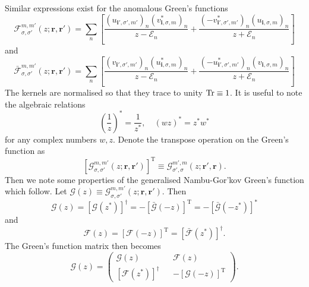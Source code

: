 Similar expressions exist for the anomalous Green's functions
\begin{equation}
\mathcal{F}_{\sigma,\sigma'}^{m,m'}\left(z;\mathbf{r},\mathbf{r}'\right)
=
\sum_n
\left[
\frac{
(u_{\mathbf{i}',\sigma',m'})_n
(v^*_{\mathbf{i},\sigma,m})_n
}{z-\mathcal{E}_n}
+
\frac{
(-v^*_{\mathbf{i}',\sigma',m'})_n
(u_{\mathbf{i},\sigma,m})_n
}{z+\mathcal{E}_n}
\right]
\end{equation}
and
\begin{equation}
\bar{\mathcal{F}}_{\sigma,\sigma'}^{m,m'}\left(z;\mathbf{r},\mathbf{r}'\right)
=
\sum_n
\left[
\frac{
(v_{\mathbf{i}',\sigma',m'})_n
(u^*_{\mathbf{i},\sigma,m})_n
}{z-\mathcal{E}_n}
+
\frac{
(-u^*_{\mathbf{i}',\sigma',m'})_n
(v_{\mathbf{i},\sigma,m})_n
}{z+\mathcal{E}_n}
\right]
\end{equation}
The kernels are normalised so that they trace to unity $\operatorname{Tr} \equiv1$.
It is useful to note the algebraic relations
\begin{equation}
\left(\frac{1}{z}\right)^*=\frac{1}{z^*}, \quad\left(wz\right)^*=z^*w^*
\end{equation}
for any complex numbers $w,z$. Denote the transpose operation on the Green's function as
\begin{equation}
\left[\mathcal{G}_{\sigma,\sigma'}^{m,m'}\left(z;\mathbf{r},\mathbf{r}'\right)\right]^\text{T}
\equiv
\mathcal{G}_{\sigma',\sigma}^{m',m}\left(z;\mathbf{r}',\mathbf{r}\right).
\end{equation}
Then we note some properties of the generalised Nambu-Gor'kov Green's function which follow. Let $\mathcal{G}\left(z\right)\equiv\mathcal{G}_{\sigma,\sigma'}^{m,m'}\left(z;\mathbf{r},\mathbf{r}'\right)$. Then
\begin{equation}
\mathcal{G}\left(z\right)
=
\left[\mathcal{G}\left(z^*\right)\right]^\dagger
=
-\left[\bar{\mathcal{G}}\left(-z\right)\right]^\text{T}
=
-\left[\bar{\mathcal{G}}\left(-z^*\right)\right]^*
\end{equation}
and
\begin{equation}
\mathcal{F}\left(z\right)
=
\left[\mathcal{F}\left(-z\right)\right]^\text{T}
=
\left[\bar{\mathcal{F}}\left(z^*\right)\right]^\dagger.
\end{equation}
The Green's function matrix then becomes
\begin{equation}
\bm{\mathcal{G}}\left(z \right) 
=
\begin{pmatrix}
\mathcal{G}\left(z \right) &&
\mathcal{F}\left(z \right)  \\
\left[{\mathcal{F}}\left(z^*\right)\right]^\dagger 
&&
-\left[{\mathcal{G}}\left(-z\right)\right]^\text{T}
\end{pmatrix}.
\end{equation}
